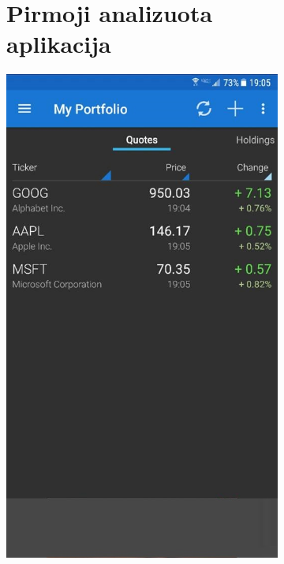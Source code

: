 \documentclass[a4paper,12pt,fleqn]{article}
\begin{document}



\newpage
\begin{appendices}
	
\begin{figure}[h!]
	\centering
	\begin{subfigure}{0.5\textwidth}
		\centering
		\section{Pirmoji analizuota aplikacija}
		\includegraphics[scale=0.532]{priedas1.jpg}
		\label{app:priedas1}
	\end{subfigure}%
	\begin{subfigure}{0.5\textwidth}
		\centering

\end{subfigure}
\end{figure}
\end{appendices}
\end{document}
